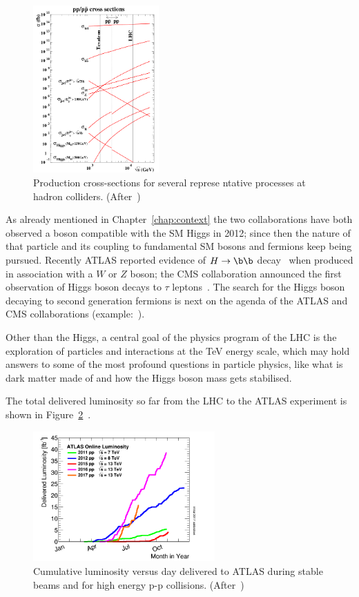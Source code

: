 \begin{figure}[!htbp]
\centering
\includegraphics[width=0.43\textwidth]{sec1_cross_lhc.png}
\caption{\label{fig:sec1_cross_lhc}Production cross-sections for several represe
ntative processes at hadron colliders. (After~\cite{Weiglein:2004hn})}
\end{figure}

As already mentioned in Chapter~\ref{chap:context}
the two collaborations have both observed a boson compatible with the SM Higgs in 2012; 
since then the nature of that particle and its coupling to fundamental SM bosons and fermions 
keep being pursued.  Recently ATLAS reported evidence of $H\to\b\b$ decay~\cite{ATLASHbb2017} 
when produced in association with a $W$ or $Z$ boson; the CMS collaboration announced 
the first observation of Higgs boson decays to $\tau$ leptons~\cite{CMSHtautau2017}. 
The search for the Higgs boson decaying to second generation fermions is next on the 
agenda of the ATLAS and CMS collaborations (example:~\cite{ATLASHmumu2017}).

Other than the Higgs, a central goal of the physics program of the LHC is the exploration of particles and 
interactions at the TeV energy scale, which may hold answers to some of the most profound questions in 
particle physics, like what is dark matter made of and how the Higgs boson mass gets stabilised.

The total delivered luminosity so far from the LHC to the ATLAS experiment  is shown in 
Figure~\ref{fig:intlumivsyear}~\cite{ATLASLumi}.

\begin{figure}[!htpb]
\centering
\includegraphics[width=0.62\textwidth]{intlumivsyear.png}
\caption{\label{fig:intlumivsyear}Cumulative luminosity versus day delivered to ATLAS during stable 
beams and for high energy p-p collisions. (After~\cite{ATLASLumi})}
\end{figure}

